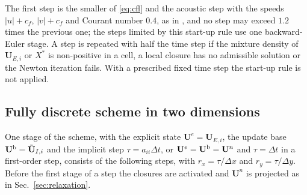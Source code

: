 The first step is the smaller of \eqref{eq:cfl} and the acoustic step with the speeds $|u|+c_f$, $|v|+c_f$ and Courant number
$0.4$, as in \cite{BattistiBoscheri2025}, and no step may exceed $1.2$ times the previous one; the steps limited by this start-up
rule use one backward-Euler stage. A step is repeated with half the time step if the mixture density of $\mathbf U_{E,i}$ or $X^*$
is non-positive in a cell, a local closure has no admissible solution or the Newton iteration fails. With a prescribed fixed
time step the start-up rule is not applied.

\subsection{Fully discrete scheme in two dimensions}
\label{sec:fully}
One stage of the scheme, with the explicit state $\mathbf U^e=\mathbf U_{E,i}$, the update base $\mathbf U^{\rm b}=\tilde{\mathbf U}_{I,i}$ and the implicit step
$\tau=a_{ii}\Delta t$, or $\mathbf U^e=\mathbf U^{\rm b}=\mathbf U^n$ and $\tau=\Delta t$ in a first-order step, consists of the following steps, with $r_x=\tau/\Delta x$
and $r_y=\tau/\Delta y$. Before the first stage of a step the closures are activated and $\mathbf U^n$ is projected as in
Sec.~\ref{sec:relaxation}.
